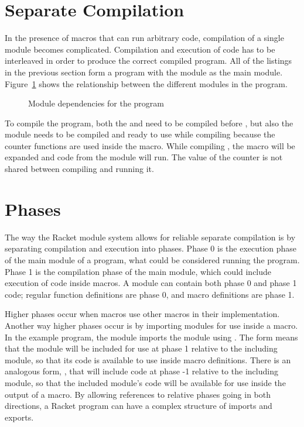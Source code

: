 \section{Separate Compilation}
In the presence of macros that can run arbitrary code, compilation of a single module becomes complicated. 
Compilation and execution of code has to be interleaved in order to produce the correct compiled program.
All of the listings in the previous section form a program with the  module as the main module.
Figure~\ref{fig:modules.tex} shows the relationship between the different modules in the program.
\begin{figure}
  
  \caption{Module dependencies for the  program}
  \label{fig:modules.tex}
\end{figure}
To compile the program, both the  and  need to be compiled before , but also the  module needs to be compiled and ready to use while compiling  because the counter functions are used inside the  macro.
While compiling , the  macro will be expanded and code from the  module will run.
The value of the counter is not shared between compiling  and running it.

\section{Phases}
The way the Racket module system allows for reliable separate compilation is by separating compilation and execution into phases.
Phase 0 is the execution phase of the main module of a program, what could be considered running the program.
Phase 1 is the compilation phase of the main module, which could include execution of code inside macros. 
A module can contain both phase 0 and phase 1 code; regular function definitions are phase 0, and macro definitions are phase 1.

Higher phases occur when macros use other macros in their implementation.
Another way higher phases occur is by importing modules for use inside a macro.
In the example program, the  module imports the  module using .
The  form means that the module will be included for use at phase 1 relative to the including module, so that its code is available to use inside macro definitions.
There is an analogous form, , that will include code at phase -1 relative to the including module, so that the included module's code will be available for use inside the output of a macro. 
By allowing references to relative phases going in both directions, a Racket program can have a complex structure of imports and exports.

